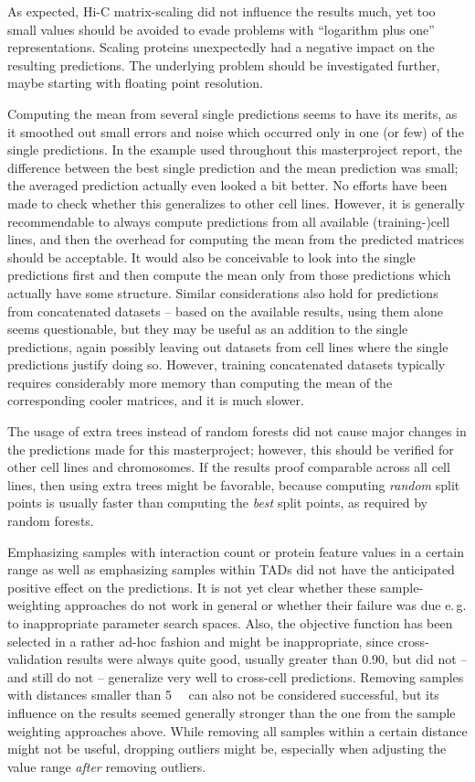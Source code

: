 As expected, Hi-C matrix-scaling did not influence the results much,
yet too small values should be avoided to evade problems with ``logarithm plus one'' representations.
Scaling proteins unexpectedly had a negative impact on the resulting predictions.
The underlying problem should be investigated further, maybe starting with floating point resolution.

Computing the mean from several single predictions seems to have its merits, 
as it smoothed out small errors and noise which occurred only in one (or few) of the single predictions.
In the example used throughout this masterproject report, the difference between the best single
prediction and the mean prediction was small; the averaged prediction actually even looked a bit better.
No efforts have been made to check whether this generalizes to other cell lines.
However, it is generally recommendable to always compute predictions from all available (training-)cell lines,
and then the overhead for computing the mean from the predicted matrices should be acceptable.
It would also be conceivable to look into the single predictions first and then compute the mean only
from those predictions which actually have some structure.
Similar considerations also hold for predictions from concatenated datasets -- based on the available results,
using them alone seems questionable, but they may be useful as an addition to the single predictions, again
possibly leaving out datasets from cell lines where the single predictions justify doing so.
However, training concatenated datasets typically requires considerably more memory than computing the
mean of the corresponding cooler matrices, and it is much slower.

The usage of extra trees instead of random forests did not cause major changes in the predictions made 
for this masterproject; however, this should be verified for other cell lines and chromosomes.
If the results proof comparable across all cell lines, then using extra trees might be favorable,
because computing \emph{random} split points is usually faster than computing the \emph{best} split points,
as required by random forests.

Emphasizing samples with interaction count or protein feature values in a certain range as
well as emphasizing samples within TADs did not have the anticipated positive effect on the predictions.
It is not yet clear whether these sample-weighting approaches do not work in general or whether 
their failure was due e.\,g. to inappropriate parameter search spaces. 
Also, the objective function has been selected in a rather ad-hoc fashion and might be inappropriate, 
since cross-validation results were always quite good, usually greater than 0.90,  
but did not -- and still do not -- generalize very well to cross-cell predictions.
Removing samples with distances smaller than \SI{5}{\kilo\bp} can also not be considered successful,
but its influence on the results seemed generally stronger than the one from the sample weighting
approaches above.
While removing all samples within a certain distance might not be useful, 
dropping outliers might be, especially when adjusting the value range \emph{after} removing outliers.

